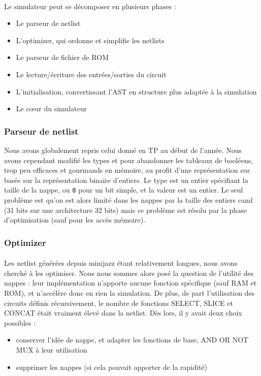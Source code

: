 \documentclass{article}
\begin{document}
\paragraph{}Le simulateur peut se décomposer en plusieurs phases :
\begin{itemize}
	\item Le parseur de netlist
	\item L'optimizer, qui ordonne et simplifie les netlists
	\item Le parseur de fichier de ROM
	\item Le lecture/écriture des entrées/sorties du circuit
	\item L'initialisation, convertissant l'AST en structure plus adaptée à la simulation
	\item Le cœur du simulateur
\end{itemize}

\subsubsection{Parseur de netlist}
Nous avons globalement repris celui donné en TP au début de l'année. Nous avons cependant modifié les types  et  pour abandonner les tableaux de booléens, trop peu efficaces et gourmands en mémoire, au profit d'une représentation sur basée sur la représentation binaire d'entiers. Le type est un entier spécifiant la taille de la nappe, ou \texttt0 pour un bit simple, et la valeur est un entier. Le seul problème est qu'on est alors limité dans les nappes par la taille des entiers caml (31 bits sur une architecture 32 bits) mais ce problème est résolu par la phase d'optimisation (sauf pour les accès mémoire).

\subsubsection{Optimizer}
\paragraph{}Les netlist générées depuis minijazz étant relativement longues, nous avons cherché à les optimiser. Nous nous sommes alors posé la question de l'utilité des nappes : leur  implémentation n'apporte aucune fonction spécifique (sauf RAM et ROM),  et n'accélère donc en rien la simulation.
De  plus, de part l'utilisation des circuits définis récursivement, le  nombre de fonctions SELECT, SLICE et CONCAT était vraiment élevé dans la netlist.
Dès lors, il y avait deux choix possibles :
\begin{itemize}
	\item conserver l'idée de nappe, et adapter les fonctions de base, AND OR NOT MUX à leur utilisation
	\item supprimer les nappes (si cela pouvait apporter de la rapidité)
\end{itemize}
\end{document}
